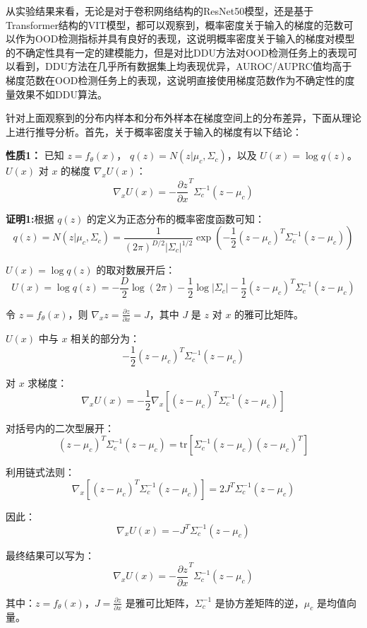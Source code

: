 从实验结果来看，无论是对于卷积网络结构的ResNet50模型，还是基于Transformer结构的VIT模型，都可以观察到，概率密度关于输入的梯度的范数可以作为OOD检测指标并具有良好的表现，这说明概率密度关于输入的梯度对模型的不确定性具有一定的建模能力，但是对比DDU方法对OOD检测任务上的表现可以看到，DDU方法在几乎所有数据集上均表现优异，AUROC/AUPRC值均高于梯度范数在OOD检测任务上的表现，这说明直接使用梯度范数作为不确定性的度量效果不如DDU算法。

针对上面观察到的分布内样本和分布外样本在梯度空间上的分布差异，下面从理论上进行推导分析。首先，关于概率密度关于输入的梯度有以下结论：

\textbf{性质1：}
已知 \( z = f_\theta(x) \)， \( q(z) = N(z|\mu_c, \Sigma_c) \)，以及 \( U(x) = \log q(z) \)。 \( U(x) \) 对 \( x \) 的梯度 \( \nabla_x U(x) \)：\[
\nabla_x U(x) = - \frac{\partial z}{\partial x}^T \Sigma_c^{-1} \left( z - \mu_c \right)
\]

\textbf{证明1:}根据 \( q(z) \) 的定义为正态分布的概率密度函数可知：
\[
q(z) = N(z|\mu_c, \Sigma_c) = \frac{1}{(2\pi)^{D/2}|\Sigma_c|^{1/2}} \exp\left(-\frac{1}{2}(z - \mu_c)^T \Sigma_c^{-1} (z - \mu_c) \right)
\]


\( U(x) = \log q(z) \) 的取对数展开后：
\[
U(x) = \log q(z) = -\frac{D}{2} \log(2\pi) - \frac{1}{2} \log |\Sigma_c| - \frac{1}{2}(z - \mu_c)^T \Sigma_c^{-1} (z - \mu_c)
\]


令 \( z = f_\theta(x) \)，则 \( \nabla_x z = \frac{\partial z}{\partial x} = J \)，其中 \( J \) 是 \( z \) 对 \( x \) 的雅可比矩阵。

\( U(x) \) 中与 \( x \) 相关的部分为：
\[
-\frac{1}{2}(z - \mu_c)^T \Sigma_c^{-1} (z - \mu_c)
\]

对 \( x \) 求梯度：
\[
\nabla_x U(x) = -\frac{1}{2} \nabla_x \left[ (z - \mu_c)^T \Sigma_c^{-1} (z - \mu_c) \right]
\]

对括号内的二次型展开：
\[
(z - \mu_c)^T \Sigma_c^{-1} (z - \mu_c) = \text{tr} \left[ \Sigma_c^{-1} (z - \mu_c) (z - \mu_c)^T \right]
\]

利用链式法则：
\[
\nabla_x \left[ (z - \mu_c)^T \Sigma_c^{-1} (z - \mu_c) \right] = 2 J^T \Sigma_c^{-1} (z - \mu_c)
\]

因此：
\[
\nabla_x U(x) = -J^T \Sigma_c^{-1} (z - \mu_c)
\]

最终结果可以写为：
\[
\nabla_x U(x) = - \frac{\partial z}{\partial x}^T \Sigma_c^{-1} \left( z - \mu_c \right)
\]

其中：\( z = f_\theta(x) \)，\( J = \frac{\partial z}{\partial x} \) 是雅可比矩阵，\( \Sigma_c^{-1} \) 是协方差矩阵的逆，\( \mu_c \) 是均值向量。

